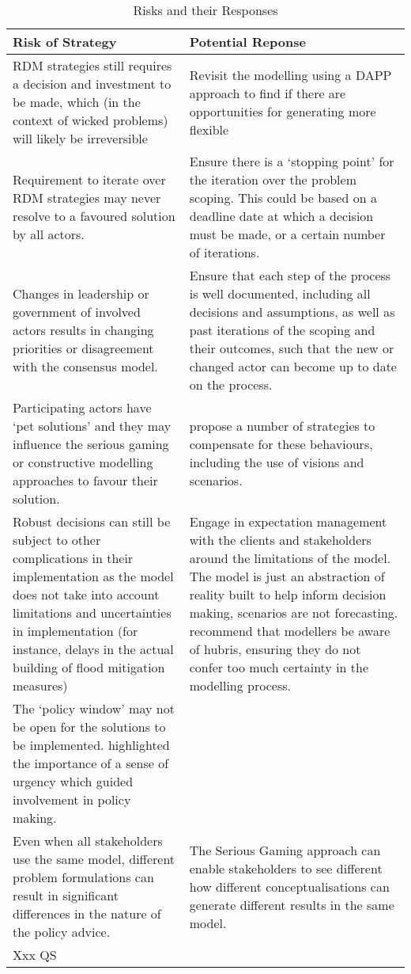 \begin{table}[h!]
\caption{Risks and their Responses}
\label{tab:pr-risks-and-responses}
\centering
\begin{tabular}{p{}|p{}}
\hline
Risk of Strategy &
  Potential Reponse \\ \hline
RDM strategies still requires a decision and investment to be made, which (in the context of wicked problems) will likely be irreversible &
  Revisit the modelling using a DAPP approach to find if there are opportunities for generating more flexible \\ \hline
Requirement to iterate over RDM strategies may never resolve to a favoured solution by all actors. &
  Ensure there is a ‘stopping point’ for the iteration over the problem scoping. This could be based on a deadline date at which a decision must be made, or a certain number of iterations. \\ \hline
Changes in leadership or government of involved actors results in changing priorities or disagreement with the consensus model. &
  Ensure that each step of the process is well documented, including all decisions and assumptions, as well as past iterations of the scoping and their outcomes, such that the new or changed actor can become up to date on the process. \\ \hline
Participating actors have ‘pet solutions’ and they may influence the serious gaming or constructive modelling approaches to favour their solution. &
  \citeauthor{pot_what_2018} propose a number of strategies to compensate for these behaviours, including the use of visions and scenarios. \\ \hline
Robust decisions can still be subject to other complications in their implementation as the model does not take into account limitations and uncertainties in implementation (for instance, delays in the actual building of flood mitigation measures) &
  Engage in expectation management with the clients and stakeholders around the limitations of the model. The model is just an abstraction of reality built to help inform decision making, scenarios are not forecasting. \cite{saltelli_five_2020} recommend that modellers be aware of hubris, ensuring they do not confer too much certainty in the modelling process. \\ \hline
The ‘policy window’ may not be open for the solutions to be implemented. \cite{rijke_room_2012} highlighted the importance of a sense of urgency which guided involvement in policy making. &
   \\ \hline
Even when all stakeholders use the same model, different problem formulations can result in significant differences in the nature of the policy advice. &
  The Serious Gaming approach can enable stakeholders to see different how different conceptualisations can generate different results in the same model. \\ \hline
Xxx QS & 
  
\end{tabular}
\end{table}


